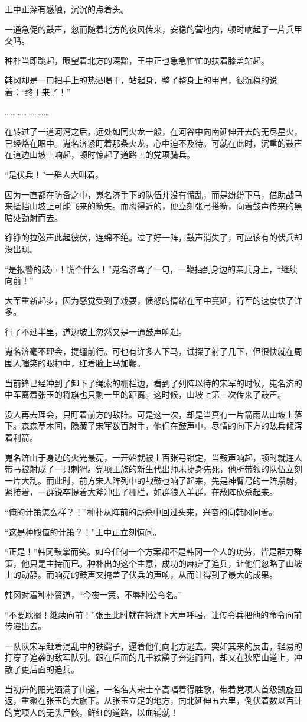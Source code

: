 王中正深有感触，沉沉的点着头。

一通急促的鼓声，忽而随着北方的夜风传来，安稳的营地内，顿时响起了一片兵甲交鸣。

种朴当即跳起，眼望着北方的深黯，王中正也急急忙忙的扶着膝盖站起。

韩冈却是一口把手上的热酒喝干，站起身，整了整身上的甲胄，很沉稳的说着：“终于来了！”

……………………

在转过了一道河湾之后，远处如同火龙一般，在河谷中向南延伸开去的无尽星火，已经烙在眼中。嵬名济紧盯着那条火龙，心中迫不及待。可就在此时，沉重的鼓声在道边山坡上响起，顿时惊起了道路上的党项骑兵。

“是伏兵！”一群人大叫着。

因为一直都在防备之中，嵬名济手下的队伍并没有慌乱，而是纷纷下马，借助战马来抵挡山坡上可能飞来的箭矢。而离得近的，便立刻张弓搭箭，向着鼓声传来的黑暗处劲射而去。

铮铮的拉弦声此起彼伏，连绵不绝。过了好一阵，鼓声消失了，可应该有的伏兵却没出现。

“是报警的鼓声！慌个什么！”嵬名济骂了一句，一鞭抽到身边的亲兵身上，“继续向前！”

大军重新起步，因为感觉受到了戏耍，愤怒的情绪在军中蔓延，行军的速度快了许多。

行了不过半里，道边坡上忽然又是一通鼓声响起。

嵬名济毫不理会，提缰前行。可也有许多人下马，试探了射了几下，但很快就在周围人嗤笑的眼神中，红着脸上马加鞭。

当前锋已经冲到了卸下了绳索的栅栏边，看到了列阵以待的宋军的时候，嵬名济的中军离着张玉的将旗也只剩一里的距离。这时候，山坡上第三次传来了鼓声。

没人再去理会，只盯着前方的敌阵。可是这一次，却是当真有一片箭雨从山坡上落下。森森草木间，隐藏了宋军数百射手，他们在鼓声中，尽情的向下方的敌兵倾泻着利箭。

嵬名济由于身边的火光最亮，一开始就被上百张弓锁定，当鼓声响起，顿时就连人带马被射成了一只刺猬。党项王族的新生代出师未捷身先死，他所带领的队伍立刻一片大乱。而此时，前方宋人阵列中的战鼓也响了起来，先是神臂弓的一阵攒射，紧接着，一群锐卒提着大斧冲出了栅栏，如群狼入羊群，在敌阵砍杀起来。

“俺的计策怎么样？！”种朴从阵前的厮杀中回过头来，兴奋的向韩冈问着。

“这是种殿值的计策？！”王中正立刻惊问。

“正是！”韩冈鼓掌而笑。如今任何一个方案都不是韩冈一个人的功劳，皆是群力群策，他只是主持而已。种朴出的这个主意，成功的麻痹了追兵，让他们忽略了山坡上的动静。而响亮的鼓声又掩盖了伏兵的声响，从而让得到了最大的成果。

韩冈对着种朴赞道，“今夜一策，不辱种公令名。”

“不要耽搁！继续向前！”张玉此时就在将旗下大声呼喝，让传令兵把他的命令向前传递出去。

一队队宋军赶着混乱中的铁鹞子，逼着他们向北方逃去。突如其来的反击，轻易的打穿了追袭的敌军队列。跟在后面的几千铁鹞子奔逃而回，却又在狭窄山道上，冲散了更后面的追兵。

当初升的阳光洒满了山道，一名名大宋士卒高唱着得胜歌，带着党项人首级凯旋回返，重聚在张玉的大旗下。从张玉立足的地方，向北延伸五六里，倒伏着数以百计的党项人的无头尸骸，鲜红的道路，以血铺就！

